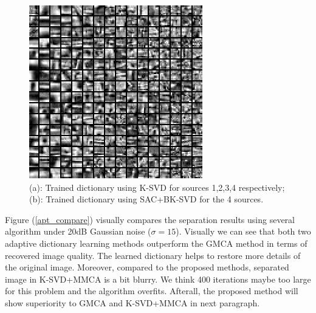 \begin{figure}[!htbp]
{\begin{minipage}[b]{0.99\linewidth}
\includegraphics[width=0.15\linewidth]{images/blockdict4.png}
\end{minipage}}
\caption{(a): Trained dictionary using K-SVD for sources 1,2,3,4 respectively; (b): Trained dictionary using SAC+BK-SVD for the 4 sources.}
\label{dictionary_learned}
\end{figure}

Figure (\ref{apt_compare}) visually compares the separation results
using several algorithm under 20dB Gaussian noise ($\sigma = 15$). Visually we can see that both two adaptive dictionary learning methods outperform the GMCA method in terms of recovered image quality. The learned dictionary helps to restore more details of the original image. Moreover, compared to the proposed methods, separated image in K-SVD+MMCA is a bit blurry. We think 400 iterations maybe too large for this problem and the 
algorithm overfits. Afterall, the proposed method will show superiority to GMCA and K-SVD+MMCA in next paragraph.\\



